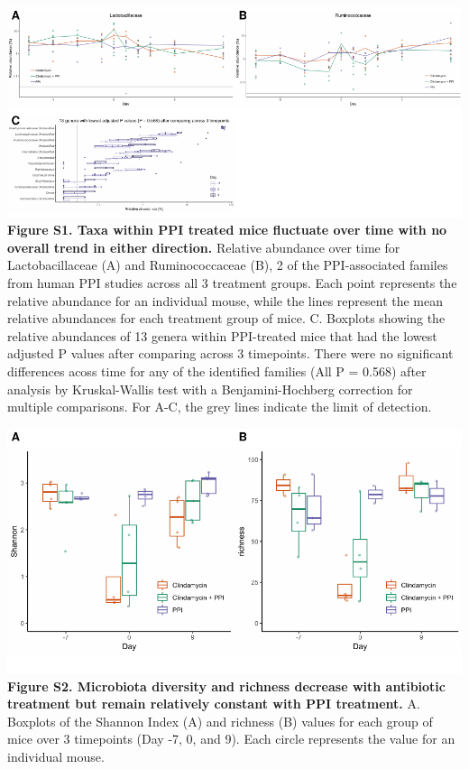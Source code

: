\documentclass[11pt,]{article}
\begin{document}
\includegraphics{figure_s1.pdf} \textbf{Figure S1. Taxa within PPI
treated mice fluctuate over time with no overall trend in either
direction.} Relative abundance over time for Lactobacillaceae (A) and
Ruminococcaceae (B), 2 of the PPI-associated familes from human PPI
studies across all 3 treatment groups. Each point represents the
relative abundance for an individual mouse, while the lines represent
the mean relative abundances for each treatment group of mice. C.
Boxplots showing the relative abundances of 13 genera within PPI-treated
mice that had the lowest adjusted P values after comparing across 3
timepoints. There were no significant differences acoss time for any of
the identified families (All P = 0.568) after analysis by Kruskal-Wallis
test with a Benjamini-Hochberg correction for multiple comparisons. For
A-C, the grey lines indicate the limit of detection.

\newpage

\includegraphics{figure_s2.pdf} \textbf{Figure S2. Microbiota diversity
and richness decrease with antibiotic treatment but remain relatively
constant with PPI treatment.} A. Boxplots of the Shannon Index (A) and
richness (B) values for each group of mice over 3 timepoints (Day -7, 0,
and 9). Each circle represents the value for an individual mouse.
\end{document}
